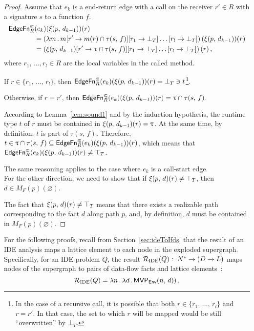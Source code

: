 \begin{proof}
    Assume that $e_k$ is a end-return edge with a call on the receiver $r'\in R$ with a signature $s$ to a function $f$.
    \begin{align*}
      \textsf{EdgeFn}^\Subset_{R}&(e_k)(\xi(p,\,d_{k-1}))(r)\\
      &=\left(\lambda m\,.\,m[r'\to m(r)\cap\tau(s,\,f)][r_1\to\bot_T]\dots[r_l\to\bot_T]\right)(\xi(p,\,d_{k-1}))(r)\\
      &=\left(\xi(p,\,d_{k-1})[r'\to \uptau\cap\tau(s,\,f)][r_1\to\bot_T]\dots[r_l\to\bot_T]\right)(r)\,,
    \end{align*}
  where $r_1,\,\dots,r_l\in R$ are the local variables in the called method.
    
    If $r\in\{r_1,\,\dots,\,r_l\}$, then $\textsf{EdgeFn}^\Subset_{R}(e_k)(\xi(p,\,d_{k-1}))(r)=\bot_T\ni t$\footnote{In the case of a recursive call, it is possible that both $r\in\{r_1,\,\dots,\,r_l\}$ and $r=r'$.
    In that case, the set to which $r$ will be mapped would be still ``overwritten'' by $\bot_T$.}.
    
    Otherwise, if $r=r'$, then $\textsf{EdgeFn}^\Subset_{R}(e_k)(\xi(p,\,d_{k-1}))(r)=\uptau\cap\tau(s,\,f)$.

    According to Lemma~\ref{lem:sound1} and by the induction hypothesis, the runtime type $t$ of $r$ must be contained in $\xi(p,\,d_{k-1})(r)=\uptau$. At the same time, by definition, $t$ is part of $\tau(s,\,f)$. Therefore, $t\in\uptau\cap\tau(s,\,f)\subseteq\textsf{EdgeFn}^\Subset_{R}(e_k)(\xi(p,\,d_{k-1}))(r)$, which means that $\textsf{EdgeFn}^\Subset_{R}(e_k)(\xi(p,\,d_{k-1}))(r)\ne\top_T$.
    
    The same reasoning applies to the case where $e_k$ is a call-start edge.\\
    
    For the other direction, we need to show that if $\xi(p,\,d)(r)\ne\top_T$, then $d\in M_F(p)(\varnothing)$.
    
    The fact that $\xi(p,\,d)(r)\ne\top_T$ means that there exists a realizable path corresponding to the fact $d$ along path $p$, and, by definition, $d$ must be contained in $M_F(p)(\varnothing)$.
\end{proof}

For the following proofs, recall from Section~\ref{sec:ideToIfds} that the result of an IDE analysis maps a lattice element to each node in the exploded supergraph. Specifically, for an IDE problem $Q$, the result $\mathcal R_{\text{IDE}}(Q):\ N^*\to(D\to L)$ maps nodes of the supergraph to pairs of data-flow facts and lattice elements~\cite{sagiv1996precise}:
\begin{equation}\label{eq:ideresult}
  \mathcal R_{\text{IDE}}(Q)=\lambda n\,.\,\lambda d\,.\,\textsf{MVP}_{\textsf{Env}}(n,\,d))\,.
\end{equation}

